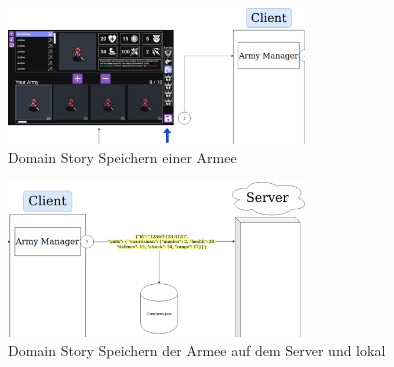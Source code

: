 \documentclass[12pt, titlepage]{scrartcl}
\begin{document}
			\begin{figure}[H] 
				\centering
				\includegraphics[width=0.7\textwidth]{ArmyManager2.png}
				\caption{Domain Story Speichern einer Armee}
				\label{DomainStoryArmyManager2}
			\end{figure}
			\begin{figure}[H] 
				\centering
				\includegraphics[width=0.7\textwidth]{ArmyManager3.png}
				\caption{Domain Story Speichern der Armee auf dem Server und lokal}
				\label{DomainStoryArmyManager3}
			\end{figure}
\end{document}
